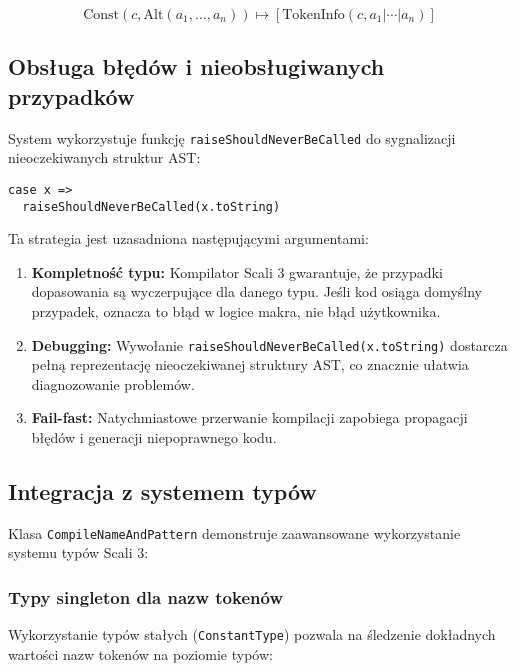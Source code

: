 \begin{equation}
    \text{Const}(c, \text{Alt}(a_1, \ldots, a_n)) \mapsto [\text{TokenInfo}(c, a_1 | \cdots | a_n)]
\end{equation}

\subsection{Obsługa błędów i nieobsługiwanych przypadków}
\label{subsec:cnp-error-handling}

System wykorzystuje funkcję \texttt{raiseShouldNeverBeCalled} do sygnalizacji nieoczekiwanych struktur AST:

\begin{lstlisting}
case x =>
  raiseShouldNeverBeCalled(x.toString)
\end{lstlisting}

Ta strategia jest uzasadniona następującymi argumentami:

\begin{enumerate}
    \item \textbf{Kompletność typu:} Kompilator Scali 3 gwarantuje, że przypadki dopasowania są wyczerpujące dla danego typu. Jeśli kod osiąga domyślny przypadek, oznacza to błąd w logice makra, nie błąd użytkownika.

    \item \textbf{Debugging:} Wywołanie \texttt{raiseShouldNeverBeCalled(x.toString)} dostarcza pełną reprezentację nieoczekiwanej struktury AST, co znacznie ułatwia diagnozowanie problemów.

    \item \textbf{Fail-fast:} Natychmiastowe przerwanie kompilacji zapobiega propagacji błędów i generacji niepoprawnego kodu.
\end{enumerate}

\subsection{Integracja z systemem typów}
\label{subsec:cnp-type-integration}

Klasa \texttt{CompileNameAndPattern} demonstruje zaawansowane wykorzystanie systemu typów Scali 3:

\subsubsection{Typy singleton dla nazw tokenów}
\label{subsubsec:cnp-singleton-types}

Wykorzystanie typów stałych (\texttt{ConstantType}) pozwala na śledzenie dokładnych wartości nazw tokenów na poziomie typów:

